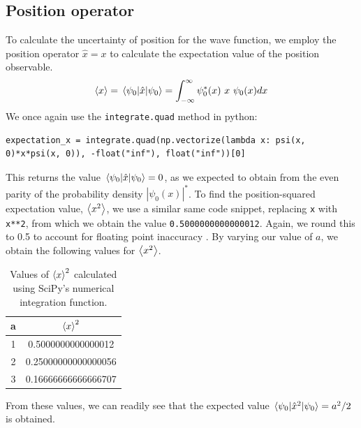 \documentclass[a4paper]{article}
\begin{document}
\subsection{Position operator}
To calculate the uncertainty of position for the wave function, we employ the position operator $\hat x=x$ to calculate the expectation value of the position observable. 
\begin{equation}
\expval x=\mel{\psi_0}{\hat x}{\psi_0}=\int^\infty_{-\infty}\psi_0^*(x)\ x\ \psi_0(x)dx
\end{equation}
We once again use the \lstinline$integrate.quad$ method in python:
\begin{lstlisting}
expectation_x = integrate.quad(np.vectorize(lambda x: psi(x, 0)*x*psi(x, 0)), -float("inf"), float("inf"))[0]
\end{lstlisting} This returns the value $\mel{\psi_0}{\hat x}{\psi_0}=0$, as we expected to obtain from the even parity of the probability density $|\psi_0(x)|^*$.
To find the position-squared expectation value, $\expval{x^2}$, we use a similar same code snippet, replacing \lstinline$x$ with \lstinline$x**2$, from which we obtain the value \lstinline$0.5000000000000012$. Again, we round this to 0.5 to account for floating point inaccuracy . By varying our value of $a$, we obtain the following values for $\expval{x^2}$.
\begin{table}[h!]
\centering
\begin{tabular}{cc}
a & $\expval x^2$ \\ \hline
1 & 0.5000000000000012  \\
2 & 0.25000000000000056 \\
3 & 0.16666666666666707
\end{tabular}
\caption{\label{tab:table}Values of $\expval x^2$ calculated using SciPy's numerical integration function.}
\end{table}

From these values, we can readily see that the expected value $\mel{\psi_0}{\hat x^2}{\psi_0} = a^2/2$ is obtained.
\end{document}
